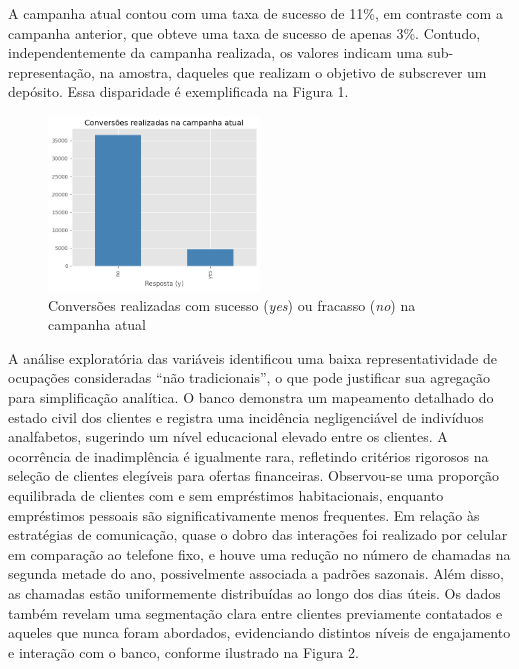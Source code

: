 \documentclass[
  onecolumn]{article}
\begin{document}
A campanha atual contou com uma taxa de sucesso de 11\%, em contraste
com a campanha anterior, que obteve uma taxa de sucesso de apenas 3\%.
Contudo, independentemente da campanha realizada, os valores indicam uma
sub-representação, na amostra, daqueles que realizam o objetivo de
subscrever um depósito. Essa disparidade é exemplificada na Figura 1.

\begin{figure}[H]

{\centering \includegraphics[width=0.5\textwidth,height=\textheight]{hist_y.png}

}

\caption{Conversões realizadas com sucesso (\emph{yes}) ou fracasso
(\emph{no}) na campanha atual}

\end{figure}%

A análise exploratória das variáveis identificou uma baixa
representatividade de ocupações consideradas ``não tradicionais'', o que
pode justificar sua agregação para simplificação analítica. O banco
demonstra um mapeamento detalhado do estado civil dos clientes e
registra uma incidência negligenciável de indivíduos analfabetos,
sugerindo um nível educacional elevado entre os clientes. A ocorrência
de inadimplência é igualmente rara, refletindo critérios rigorosos na
seleção de clientes elegíveis para ofertas financeiras. Observou-se uma
proporção equilibrada de clientes com e sem empréstimos habitacionais,
enquanto empréstimos pessoais são significativamente menos frequentes.
Em relação às estratégias de comunicação, quase o dobro das interações
foi realizado por celular em comparação ao telefone fixo, e houve uma
redução no número de chamadas na segunda metade do ano, possivelmente
associada a padrões sazonais. Além disso, as chamadas estão
uniformemente distribuídas ao longo dos dias úteis. Os dados também
revelam uma segmentação clara entre clientes previamente contatados e
aqueles que nunca foram abordados, evidenciando distintos níveis de
engajamento e interação com o banco, conforme ilustrado na Figura 2.
\end{document}
